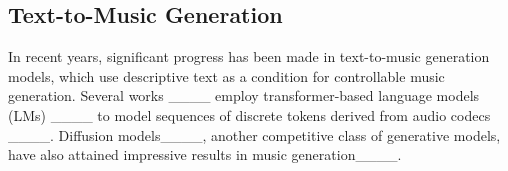 \subsection{Text-to-Music Generation}
In recent years, significant progress has been made in text-to-music generation models, which use descriptive text as a condition for controllable music generation.
Several works ____ employ transformer-based language models (LMs) ____ to model sequences of discrete tokens derived from audio codecs ____.
Diffusion models____, another competitive class of generative models, have also attained impressive results in music generation____.
